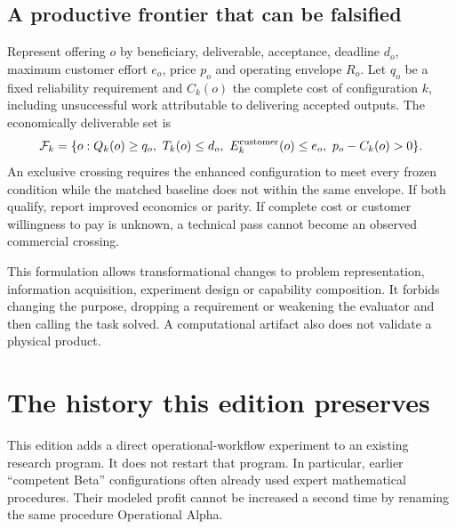 \documentclass[11pt,letterpaper]{article}
\begin{document}
\subsection{A productive frontier that can be falsified}
Represent offering $o$ by beneficiary, deliverable, acceptance, deadline $d_o$, maximum customer effort $e_o$, price $p_o$ and operating envelope $R_o$. Let $q_o$ be a fixed reliability requirement and $C_k(o)$ the complete cost of configuration $k$, including unsuccessful work attributable to delivering accepted outputs. The economically deliverable set is
\[
\mathcal F_k=\{o:Q_k(o)\geq q_o,\ T_k(o)\leq d_o,\ E^{\rm customer}_k(o)\leq e_o,\ p_o-C_k(o)>0\}.
\]
An exclusive crossing requires the enhanced configuration to meet every frozen condition while the matched baseline does not within the same envelope. If both qualify, report improved economics or parity. If complete cost or customer willingness to pay is unknown, a technical pass cannot become an observed commercial crossing.

This formulation allows transformational changes to problem representation, information acquisition, experiment design or capability composition. It forbids changing the purpose, dropping a requirement or weakening the evaluator and then calling the task solved. A computational artifact also does not validate a physical product.

\section{The history this edition preserves}
This edition adds a direct operational-workflow experiment to an existing research program. It does not restart that program. In particular, earlier ``competent Beta'' configurations often already used expert mathematical procedures. Their modeled profit cannot be increased a second time by renaming the same procedure Operational Alpha.
\end{document}

